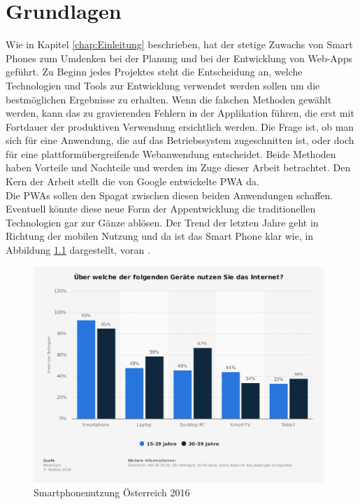 \chapter{Grundlagen}
\thispagestyle{standard}
\pagestyle{standard}
\renewcommand{\footrulewidth}{0.4pt}

Wie in Kapitel \ref{chap:Einleitung} beschrieben, hat der stetige Zuwachs von Smart Phones zum Umdenken bei der Planung und bei der Entwicklung von \acl{Web-App}s geführt.
Zu Beginn jedes Projektes steht die Entscheidung an, welche Technologien und Tools zur Entwicklung verwendet werden sollen um die bestmöglichen Ergebnisse zu erhalten.
Wenn die falschen Methoden gewählt werden, kann das zu gravierenden Fehlern in der Applikation führen, die erst mit Fortdauer der produktiven Verwendung ersichtlich werden. 
Die Frage ist, ob man sich für eine Anwendung, die auf das Betriebssystem zugeschnitten ist, oder doch für eine plattformübergreifende Webanwendung entscheidet. Beide Methoden haben Vorteile und Nachteile und werden im Zuge dieser Arbeit betrachtet. Den Kern der Arbeit stellt die von Google entwickelte \acs{PWA}  da. \\Die \acs{PWA}s sollen den Spagat zwischen diesen beiden Anwendungen schaffen. Eventuell könnte diese neue Form der Appentwicklung die traditionellen Technologien gar zur Gänze ablösen.
Der Trend der letzten Jahre geht in Richtung der mobilen Nutzung und da ist das Smart Phone klar wie, in Abbildung \ref{fig:Smartphonenutzung} dargestellt, voran  \cite{Geraetenutzung} \cite{PWA}.  


\begin{figure}[h]
	\centering
	\includegraphics[width=11cm]{BilderAllgemein/SmartPhoneNutzung}\medskip
	\caption{Smartphonenutzung Österreich 2016 \cite{Geraetenutzung}}
	\label{fig:Smartphonenutzung}
\end{figure}

